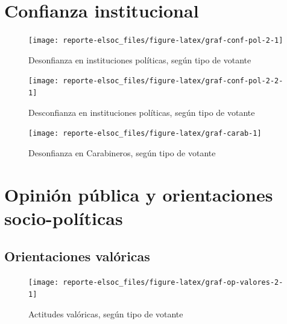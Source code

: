 \documentclass[
  12pt,
]{book}
\begin{document}
\hypertarget{confianza-institucional}{%
\section{Confianza institucional}\label{confianza-institucional}}

\begin{figure}

{\centering \texttt{[image: reporte-elsoc\_files/figure-latex/graf-conf-pol-2-1]} 

}

\caption{Desonfianza en instituciones políticas, según tipo de votante}\label{fig:graf-conf-pol-2}
\end{figure}

\begin{figure}

{\centering \texttt{[image: reporte-elsoc\_files/figure-latex/graf-conf-pol-2-2-1]} 

}

\caption{Desconfianza en instituciones políticas, según tipo de votante}\label{fig:graf-conf-pol-2-2}
\end{figure}

\begin{figure}

{\centering \texttt{[image: reporte-elsoc\_files/figure-latex/graf-carab-1]} 

}

\caption{Desonfianza en Carabineros, según tipo de votante}\label{fig:graf-carab}
\end{figure}

\hypertarget{opiniuxf3n-puxfablica-y-orientaciones-socio-poluxedticas}{%
\section{Opinión pública y orientaciones socio-políticas}\label{opiniuxf3n-puxfablica-y-orientaciones-socio-poluxedticas}}

\hypertarget{orientaciones-valuxf3ricas}{%
\subsection{Orientaciones valóricas}\label{orientaciones-valuxf3ricas}}

\begin{figure}

{\centering \texttt{[image: reporte-elsoc\_files/figure-latex/graf-op-valores-2-1]} 

}

\caption{Actitudes valóricas, según tipo de votante}\label{fig:graf-op-valores-2}
\end{figure}
\end{document}
